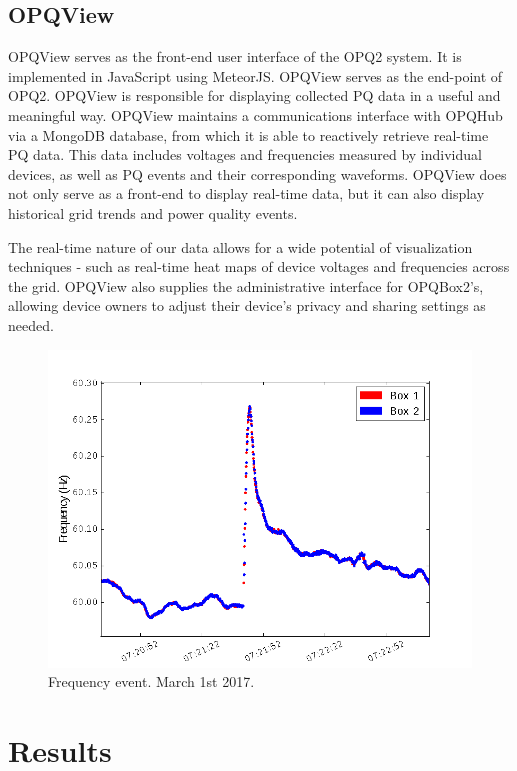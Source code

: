 \documentclass[a4paper, conference]{IEEEtran}
\begin{document}
\subsection{OPQView}
OPQView serves as the front-end user interface of the OPQ2 system. It is implemented in JavaScript using MeteorJS. OPQView serves as the end-point of OPQ2. OPQView is responsible for displaying collected PQ data in a useful and meaningful way. OPQView maintains a communications interface with OPQHub via a MongoDB database, from which it is able to reactively retrieve real-time PQ data. This data includes voltages and frequencies measured by individual devices, as well as PQ events and their corresponding waveforms.  OPQView does not only serve as a front-end to display real-time data, but it can also display historical grid trends and power quality events. 

The real-time nature of our data allows for a wide potential of visualization techniques - such as real-time heat maps of device voltages and frequencies across the grid. OPQView also supplies the administrative interface for OPQBox2's, allowing device owners to adjust their device's privacy and sharing settings as needed. 

\begin{figure}[h]
    \centering
    \includegraphics[width=0.9\columnwidth]{img/Event1_f.png}
    \caption{Frequency event. March 1st 2017.}
    \label{fig:event}
\end{figure}

\section{Results}
\end{document}
